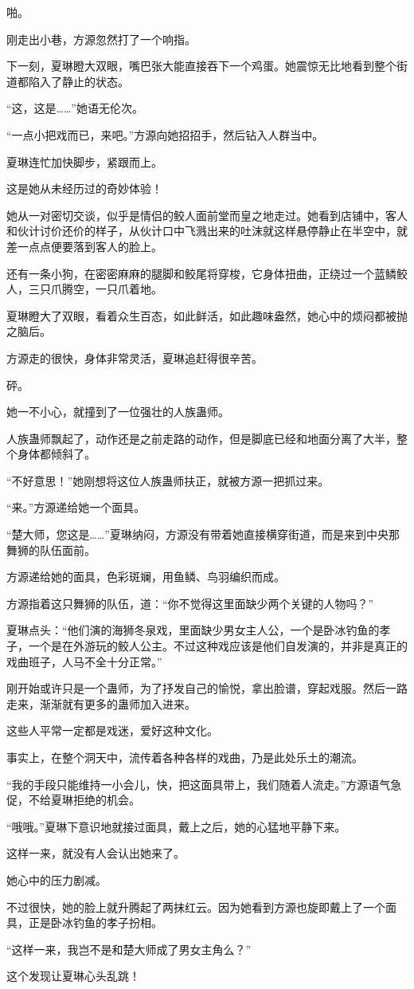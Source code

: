 \begin{this_body}
啪。

刚走出小巷，方源忽然打了一个响指。

下一刻，夏琳瞪大双眼，嘴巴张大能直接吞下一个鸡蛋。她震惊无比地看到整个街道都陷入了静止的状态。

“这，这是……”她语无伦次。

“一点小把戏而已，来吧。”方源向她招招手，然后钻入人群当中。

夏琳连忙加快脚步，紧跟而上。

这是她从未经历过的奇妙体验！

她从一对密切交谈，似乎是情侣的鲛人面前堂而皇之地走过。她看到店铺中，客人和伙计讨价还价的样子，从伙计口中飞溅出来的吐沫就这样悬停静止在半空中，就差一点点便要落到客人的脸上。

还有一条小狗，在密密麻麻的腿脚和鲛尾将穿梭，它身体扭曲，正绕过一个蓝鳞鲛人，三只爪腾空，一只爪着地。

夏琳瞪大了双眼，看着众生百态，如此鲜活，如此趣味盎然，她心中的烦闷都被抛之脑后。

方源走的很快，身体非常灵活，夏琳追赶得很辛苦。

砰。

她一不小心，就撞到了一位强壮的人族蛊师。

人族蛊师飘起了，动作还是之前走路的动作，但是脚底已经和地面分离了大半，整个身体都倾斜了。

“不好意思！”她刚想将这位人族蛊师扶正，就被方源一把抓过来。

“来。”方源递给她一个面具。

“楚大师，您这是……”夏琳纳闷，方源没有带着她直接横穿街道，而是来到中央那舞狮的队伍面前。

方源递给她的面具，色彩斑斓，用鱼鳞、鸟羽编织而成。

方源指着这只舞狮的队伍，道：“你不觉得这里面缺少两个关键的人物吗？”

夏琳点头：“他们演的海狮冬泉戏，里面缺少男女主人公，一个是卧冰钓鱼的孝子，一个是在外游玩的鲛人公主。不过这种戏应该是他们自发演的，并非是真正的戏曲班子，人马不全十分正常。”

刚开始或许只是一个蛊师，为了抒发自己的愉悦，拿出脸谱，穿起戏服。然后一路走来，渐渐就有更多的蛊师加入进来。

这些人平常一定都是戏迷，爱好这种文化。

事实上，在整个洞天中，流传着各种各样的戏曲，乃是此处乐土的潮流。

“我的手段只能维持一小会儿，快，把这面具带上，我们随着人流走。”方源语气急促，不给夏琳拒绝的机会。

“哦哦。”夏琳下意识地就接过面具，戴上之后，她的心猛地平静下来。

这样一来，就没有人会认出她来了。

她心中的压力剧减。

不过很快，她的脸上就升腾起了两抹红云。因为她看到方源也旋即戴上了一个面具，正是卧冰钓鱼的孝子扮相。

“这样一来，我岂不是和楚大师成了男女主角么？”

这个发现让夏琳心头乱跳！

\end{this_body}

